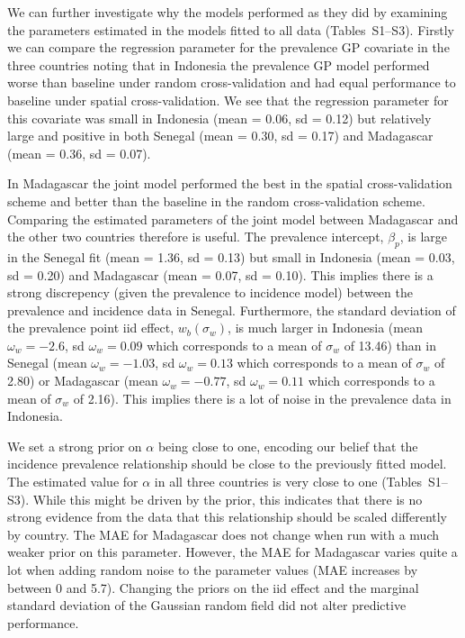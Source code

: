 \documentclass{statsoc}
\begin{document}

We can further investigate why the models performed as they did by examining the parameters estimated in the models fitted to all data (Tables~S1--S3).
Firstly we can compare the regression parameter for the prevalence GP covariate in the three countries noting that in Indonesia the prevalence GP model performed worse than baseline under random cross-validation and had equal performance to baseline under spatial cross-validation.
We see that the regression parameter for this covariate was small in Indonesia (mean = 0.06, sd = 0.12) but relatively large and positive in both Senegal (mean = 0.30, sd = 0.17) and Madagascar  (mean = 0.36, sd = 0.07).

In Madagascar the joint model performed the best in the spatial cross-validation scheme and better than the baseline in the random cross-validation scheme. 
Comparing the estimated parameters of the joint model between Madagascar and the other two countries therefore is useful.
The prevalence intercept, $\beta_p$, is large in the Senegal fit (mean = 1.36, sd = 0.13) but small in Indonesia (mean = 0.03, sd = 0.20) and Madagascar (mean = 0.07, sd = 0.10).
This implies there is a strong discrepency (given the prevalence to incidence model) between the prevalence and incidence data in Senegal.
Furthermore, the standard deviation of the prevalence point iid effect, $w_b(\sigma_w)$, is much larger in Indonesia (mean $\omega_w = -2.6$, sd $\omega_w = 0.09$ which corresponds to a mean of $\sigma_w$ of 13.46) than in Senegal (mean $\omega_w = -1.03$, sd $\omega_w = 0.13$ which corresponds to a mean of $\sigma_w$ of 2.80) or Madagascar (mean $\omega_w = -0.77$, sd $\omega_w = 0.11$ which corresponds to a mean of $\sigma_w$ of 2.16).
This implies there is a lot of noise in the prevalence data in Indonesia.

We set a strong prior on $\alpha$ being close to one, encoding our belief that the incidence prevalence relationship should be close to the previously fitted model.
The estimated value for $\alpha$ in all three countries is very close to one (Tables~S1--S3).
While this might be driven by the prior, this indicates that there is no strong evidence from the data that this relationship should be scaled differently by country.
The MAE for Madagascar does not change when run with a much weaker prior on this parameter.
However, the MAE for Madagascar varies quite a lot when adding random noise to the parameter values (MAE increases by between 0 and 5.7).
Changing the priors on the iid effect and the marginal standard deviation of the Gaussian random field did not alter predictive performance.
\end{document}
